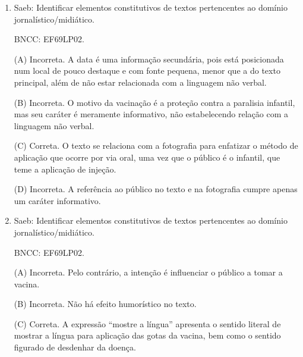 \begin{enumerate}
(B) Correta. As duas notícias abordam o mesmo fato sob enfoques
diferentes: uma apresenta uma pesquisa de opinião sobre a segurança no
carnaval e a outra, dados estatísticos sobre a segurança no evento.
Ambos os dados comprovam o fato principal de que o carnaval foi mais
seguro em São Paulo em relação a anos anteriores.

(C) Incorreta. Ambos os veículos de notícia têm credibilidade perante a
sociedade, porém isso não é suficiente para sanar possíveis dúvidas
sobre as informações, pois estas são de caráter quantitativo.

(D) Incorreta. A fonte bibliográfica das notícias indica que elas foram
publicadas na internet, mas não se trata de um fator que ajude a
esclarecer possíveis dúvidas sobre as informações.

\item

Saeb: Identificar elementos constitutivos de textos pertencentes ao
domínio jornalístico/midiático.

BNCC: EF69LP02.

(A) Incorreta. A data é uma informação secundária, pois está posicionada
num local de pouco destaque e com fonte pequena, menor que a do texto
principal, além de não estar relacionada com a linguagem não verbal.

(B) Incorreta. O motivo da vacinação é a proteção contra a paralisia
infantil, mas seu caráter é meramente informativo, não estabelecendo
relação com a linguagem não verbal.

(C) Correta. O texto se relaciona com a fotografia para enfatizar o
método de aplicação que ocorre por via oral, uma vez que o público é o
infantil, que teme a aplicação de injeção.

(D) Incorreta. A referência ao público no texto e na fotografia cumpre
apenas um caráter informativo.

\item

Saeb: Identificar elementos constitutivos de textos pertencentes ao
domínio jornalístico/midiático.

BNCC: EF69LP02.

(A) Incorreta. Pelo contrário, a intenção é influenciar o público a
tomar a vacina.

(B) Incorreta. Não há efeito humorístico no texto.

(C) Correta. A expressão ``mostre a língua'' apresenta o sentido literal
de mostrar a língua para aplicação das gotas da vacina, bem como o
sentido figurado de desdenhar da doença.


\end{enumerate}
